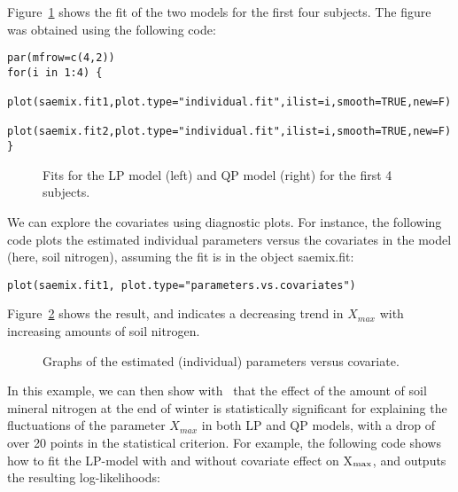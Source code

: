{Figure~\ref{fig:yieldindiv} shows the fit of the two models for the first four subjects. The figure was obtained using the following code:
\begin{verbatim}
par(mfrow=c(4,2))
for(i in 1:4) {
  plot(saemix.fit1,plot.type="individual.fit",ilist=i,smooth=TRUE,new=F)
  plot(saemix.fit2,plot.type="individual.fit",ilist=i,smooth=TRUE,new=F)
}
\end{verbatim}

\begin{figure}[!h]
\begin{center}
\par \kern -1cm
\end{center}
\par \kern -0.5cm
\caption{Fits for the LP model (left) and QP model (right) for the first 4 subjects.} \label{fig:yieldindiv}
\end{figure}
\clearpage

We can explore the covariates using diagnostic plots. For instance, the following code plots the estimated individual parameters versus the covariates in the model (here, soil nitrogen), assuming the fit is in the object saemix.fit:
\begin{verbatim}
plot(saemix.fit1, plot.type="parameters.vs.covariates")
\end{verbatim}
Figure~\ref{fig:yieldparcov} shows the result, and indicates a decreasing trend in $X_{max}$ with increasing amounts of soil nitrogen.
\begin{figure}[!h]
\begin{center}
\par \kern -1cm
\end{center}
\par \kern -0.5cm
\caption{Graphs of the estimated (individual) parameters versus covariate.} \label{fig:yieldparcov}
\end{figure}

In this example, we can then show with \monolix~that the effect of the amount of soil mineral nitrogen at the end of winter is statistically significant for explaining the fluctuations of the parameter $X_{max}$ in both LP and QP models, with a drop of over 20 points in the statistical criterion. For example, the following code shows how to fit the LP-model with and without covariate effect on X$_{\rm max}$, and outputs the resulting log-likelihoods:

}
